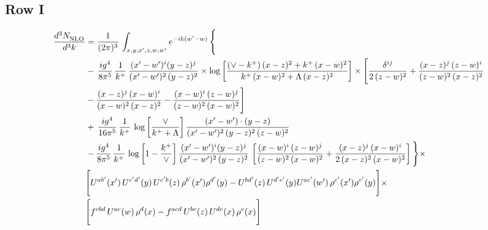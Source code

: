 \documentclass[9pt]{article}
\numberwithin{equation}{section}
\begin{document}
\subsection{Row I}
\begin{align}
     \frac{d^{3}N_{\rm NLO}^{\rm}}{d^{3}k}  & =  \frac{1}{(2\pi)^{3}}\, \int_{x,y,x',z,w,w^{\prime}} e^{-ik(w^{\prime}-w)}\, \Bigg\{\notag \\ & -\,\frac{ig^{4}}{8\pi^{5}}\,\frac{1}{k^{+}}\,\frac{(x'-w')^{i}(y-z)^{j}}{(x'-w')^{2}\,(y-z)^{2}}\times \log{\left[\frac{(\vee-k^{+})\,(x-z)^{2}+k^{+}\,(x-w)^{2}}{k^{+}\,(x-w)^{2}+\Lambda\, (x-z)^{2}}\right]}\times \Bigg[\frac{\delta^{ij}}{2\,(z-w)^{2}}+\frac{(x-z)^{j}\,(z-w)^{i}}{(z-w)^{2}\,(x-z)^{2}}\notag \\ & -\frac{(x-z)^{j}\,(x-w)^{i}}{(x-w)^{2}\,(x-z)^{2}}-\frac{(x-w)^{i}\,(z-w)^{j}}{(z-w)^{2}\,(x-w)^{2}}\Bigg]\notag \\ & +\,\frac{ig^{4}}{16\pi^{5}}\,\frac{1}{k^{+}}\,\log{\left[\frac{\vee}{k^{+}+\Lambda}\right]}\, \frac{(x'-w')\cdot (y-z)}{(x'-w')^{2}\,(y-z)^{2}\,(z-w)^{2}}\notag \\ & -\frac{ig^{4}}{8\pi^{5}}\,\frac{1}{k^{+}}\, \log{\left[1-\frac{k^{+}}{\vee}\right]}\,\frac{(x'-w')^{i}(y-z)^{j}}{(x'-w')^{2}\,(y-z)^{2}}\,\left[\frac{(x-w)^{i}\,(z-w)^{j}}{(z-w)^{2}\,(x-w)^{2}}+\frac{(x-z)^{j}\,(x-w)^{i}}{2\,(x-z)^{2}\, (x-w)^{2}}\right]\Bigg\}\times \notag \\ &  \Bigg[U^{ab'}(x')\,U^{c'd'}(y)\,U^{c'b}(z)\,\rho^{b'}(x')\rho^{d'}(y)-U^{bd'}(z)\,U^{d'e'}(y)U^{ac'}(w')\,\rho^{c'}(x')\rho^{e'}(y)\Bigg]\times\notag \\ & \Bigg[f^{cbd}\,U^{ac}(w)\,\rho^{d}(x)-f^{acd}\, U^{bc}(z)\,U^{de}(x)\,\rho^{e}(x)\Bigg] 
\end{align}
\end{document}
